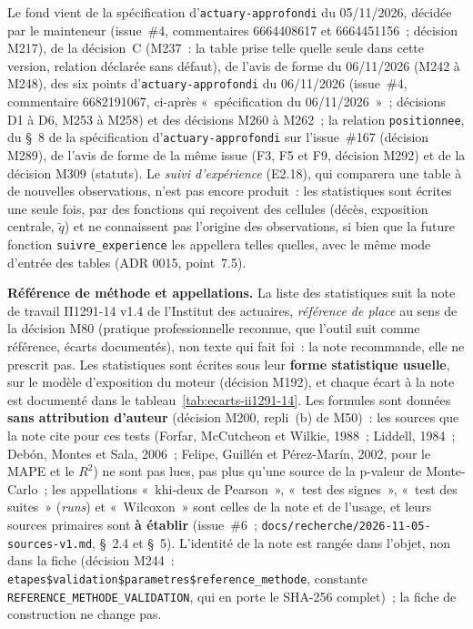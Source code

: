 \documentclass[a4paper,11pt]{article}
\newcommand{\code}[1]{\texttt{\small #1}}
\begin{document}
\medskip
\noindent
Le fond vient de la spécification d'\code{actuary-approfondi} du
05/11/2026, décidée par le mainteneur (issue~\#4, commentaires 6664408617
et 6664451156~; décision M217), de la décision~C (M237~: la table prise
telle quelle seule dans cette version, relation déclarée sans défaut), de
l'avis de forme du 06/11/2026 (M242 à M248), des six points
d'\code{actuary-approfondi} du 06/11/2026 (issue~\#4, commentaire
6682191067, ci-après «~spécification du 06/11/2026~»~; décisions D1 à D6,
M253 à M258) et des décisions M260 à M262~; la relation
\code{positionnee}, du §~8 de la spécification d'\code{actuary-approfondi}
sur l'issue~\#167 (décision M289), de l'avis de forme de la même issue (F3,
F5 et F9, décision M292) et de la décision M309 (statuts).
Le \emph{suivi d'expérience} (E2.18), qui comparera une table à de nouvelles
observations, n'est pas encore produit~: les statistiques sont écrites une
seule fois, par des fonctions qui reçoivent des cellules (décès, exposition
centrale, $\tilde q$) et ne connaissent pas l'origine des observations, si
bien que la future fonction \code{suivre\_experience} les appellera telles
quelles, avec le même mode d'entrée des tables (ADR 0015, point~7.5).

\begin{encadre}
\small
\textbf{Référence de méthode et appellations.} La liste des statistiques
suit la note de travail II1291-14 v1.4 de l'Institut des actuaires,
\emph{référence de place} au sens de la décision M80 (pratique
professionnelle reconnue, que l'outil suit comme référence, écarts
documentés), non texte qui fait foi~: la note recommande, elle ne prescrit
pas. Les statistiques sont écrites sous leur \textbf{forme statistique
usuelle}, sur le modèle d'exposition du moteur (décision M192), et chaque
écart à la note est documenté dans le
tableau~\ref{tab:ecarts-ii1291-14}. Les formules sont données \textbf{sans
attribution d'auteur} (décision M200, repli~(b) de M50)~: les sources que
la note cite pour ces tests (Forfar, McCutcheon et Wilkie, 1988~; Liddell,
1984~; Debón, Montes et Sala, 2006~; Felipe, Guillén et Pérez-Marín,
2002, pour le MAPE et le $R^2$) ne sont pas lues, pas plus qu'une source
de la p-valeur de Monte-Carlo~; les appellations «~khi-deux de Pearson~»,
«~test des signes~», «~test des suites~» (\emph{runs}) et «~Wilcoxon~»
sont celles de la note et de l'usage, et leurs sources primaires sont
\textbf{à établir} (issue~\#6~; \code{docs/recherche/}\allowbreak\code{2026-11-05-sources-v1.md},
§~2.4 et §~5). L'identité de la note est rangée dans l'objet, non dans la
fiche (décision M244~: \code{etapes\$validation\$parametres\$}\allowbreak\code{reference\_methode},
constante \code{REFERENCE\_METHODE\_VALIDATION}, qui en porte le SHA-256
complet)~; la fiche de construction ne change pas.
\end{encadre}
\end{document}
